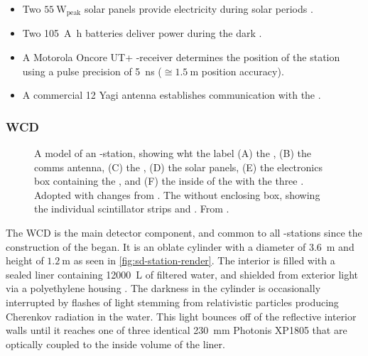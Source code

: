 \begin{itemize}
	\item Two $\SI{55}{\watt}_\mathrm{peak}$ solar panels provide 
	electricity during solar periods 
	\cite{collaborationPierreAugerObservatory2016}.
	\item Two \SI{105}{\ampere\hour} batteries deliver power during	the 
	dark \cite{collaborationPierreAugerObservatory2016}.
	\item A Motorola Oncore UT+ \GPS-receiver determines the position of the
	station using a pulse precision of \SI{5}{\nano\second} 
	\cite{networktimefoundationMotorolaOncoreGPS} ($\cong\SI{1.5}{\meter}$
	position accuracy).
	\item A commercial \SI{12}{\dBi} Yagi antenna \cite{rfwel12DBiYagi} 
	establishes communication with the \CDAS.
\end{itemize}

\subsubsection{\acf{WCD}}

\begin{figure}[t]
  \centering
  \hspace{0.2cm}
  \caption[]{ A model of an \SD-station, showing
  wht the label (A) the \RD, (B) the comms antenna, (C) the \SSD, (D) the solar
  panels, (E) the electronics box containing the \UUB, and (F) the inside of the
  \WCD with the three \LPMTs. Adopted with changes from 
  \cite{filipPotentialNeuralNetwork2023}.  The 
  \SSD without enclosing box, showing the individual scintillator strips and 
  \WLSs. From \cite{schmidtUHECR2024ProceedingEdits25}.}
  \label{fig:sd-station-components}
\end{figure}

The \acf{WCD} is the main detector component, and common to all \SD-stations 
since the construction of the \PAO began. It is an oblate cylinder with a 
diameter of \SI{3.6}{\meter} and height of $\SI{1.2}{\meter}$ as seen in 
\cref{fig:sd-station-render}. The interior is filled with a sealed liner 
containing \SI{12000}{\liter} of filtered water, and shielded from exterior 
light via a polyethylene housing \cite{allekotteSurfaceDetectorSystem2008}. The 
darkness in the cylinder is occasionally interrupted by flashes of light 
stemming from relativistic particles producing Cherenkov radiation in the water.
This light bounces off of the reflective interior walls until it reaches one of 
three identical \SI{230}{\milli\meter} Photonis XP1805 \LPMTs 
\cite{tripathiSystematicStudyLarge2003} that are optically coupled to the inside
volume of the liner.

